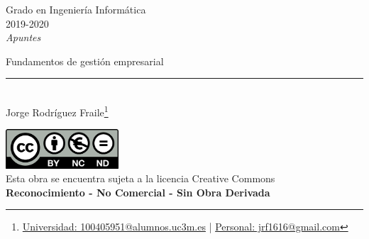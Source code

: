 \documentclass[12pt, twoside, openright]{report} %
\begin{document}

\begin{titlepage}
	\begin{sffamily}
		\color{azulUC3M}
		\begin{center}
			\begin{figure}[H] %
			\end{figure}
			\vspace{2.5cm}
			\begin{Large}
				Grado en Ingeniería Informática\\
				2019-2020\\
				\vspace{2cm}
				\textsl{Apuntes}\\
				\bigskip
			\end{Large}
			{\Huge Fundamentos de gestión empresarial}\\
			\vspace*{0.5cm}
			\rule{10.5cm}{0.1mm}\\
			\vspace*{0.9cm}
			{\LARGE Jorge Rodríguez Fraile\footnote{\href{mailto:100405951@alumnos.uc3m.es}{Universidad: 100405951@alumnos.uc3m.es}  |  \href{mailto:jrf1616@gmail.com}{Personal: jrf1616@gmail.com}}}\\
			\vspace*{1cm}
		\end{center}
		\vfill
		\color{black}
		\includegraphics[width=4.2cm]{img/creativecommons.png}\\
		Esta obra se encuentra sujeta a la licencia Creative Commons\\ \textbf{Reconocimiento - No Comercial - Sin Obra Derivada}
	\end{sffamily}
\end{titlepage}


\tableofcontents
\thispagestyle{fancy}
\end{document}
